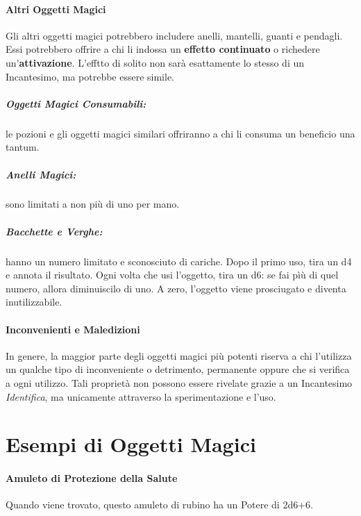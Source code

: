 \documentclass[itdr]{subfiles}
\begin{document}
\paragraph{Altri Oggetti Magici}
Gli altri oggetti magici potrebbero includere anelli, mantelli, guanti e pendagli. Essi potrebbero offrire a chi li indossa un \textbf{effetto continuato} o richedere un'\textbf{attivazione}. L'efftto di solito non sarà esattamente lo stesso di un Incantesimo, ma potrebbe essere simile.

\vfill

\subparagraph{Oggetti Magici Consumabili:} le pozioni e gli oggetti magici similari offriranno a chi li consuma un beneficio una tantum.

\vfill

\subparagraph{Anelli Magici:} sono limitati a non più di uno per mano.

\vfill

\subparagraph{Bacchette e Verghe:} hanno un numero limitato e sconosciuto di cariche. Dopo il primo uso, tira un d4 e annota il risultato. Ogni volta che usi l'oggetto, tira un d6: se fai pìù di quel numero, allora diminuiscilo di uno. A zero, l'oggetto viene prosciugato e diventa inutilizzabile.

\vfill

\paragraph{Inconvenienti e Maledizioni}
In genere, la maggior parte degli oggetti magici più potenti riserva a chi l'utilizza un qualche tipo di inconveniente o detrimento, \mbox{permanente} oppure che si verifica a ogni utilizzo. Tali proprietà non possono essere rivelate grazie a un Incantesimo \textit{Identifica}, ma unicamente attraverso la sperimentazione e l'uso.

\vfill
{}
\vfill
\break


\section{Esempi di Oggetti Magici}

\paragraph{Amuleto di Protezione della Salute}
Quando viene trovato, questo amuleto di rubino ha un Potere di 2d6+6.
\end{document}
